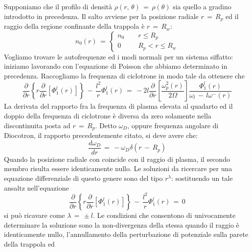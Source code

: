 Supponiamo che il profilo di densità $\rho\left(r,\,\theta\right)\,=\,\rho\left(\theta\right)$ sia quello a gradino introdotto
in precedenza. Il salto avviene per la posizione radiale $r\,=\,R_p$ ed il raggio della regione confinante della trappola 
è $r\,=\,R_w$:
\begin{equation}
    n_0\left(r\right)\,=\,
    \begin{cases}
        n_0     \qquad        r \leq R_p \\
        0       \,\,\, \qquad        R_p < r \leq R_w 
    \end{cases}
\end{equation}
Vogliamo trovare le autofrequenze ed i modi normali per un sistema siffatto: iniziamo lavorando con l'equazione di Poisson che abbiamo
determinato in precedenza. Raccogliamo la frequenza di ciclotrone in modo tale da ottenere che
\begin{equation}
    \frac{\partial}{\partial r}\left\{r\frac{\partial}{\partial r}\left[\Phi^l_1\left(r\right)\right]\right\}\,-\,\frac{l^2}{r}\Phi_1^l\left(r\right)\,=\,-2l \frac{\partial}{\partial r}\left[\frac{\omega_p^2\left(r\right)}{2\Omega}\right]\frac{\Phi_1^l\left(r\right)}{\omega_l\,-\,l\omega^-\left(r\right)}
    \label{equation: diffPhi_rhoGrad}
\end{equation}
La derivata del rapporto fra la frequenza di plasma elevata al quadarto ed il doppio della frequenza di ciclotrone è diversa da zero 
solamente nella discontinuita posta ad $r\,=\,R_p$. Detto $\omega_D$, oppure frequenza angolare di Diocotron, il rapporto precedentemente
citato, si deve avere che:
\begin{equation}
    \frac{d \omega_D}{dr}\,=\,-\omega_D\delta\left(r\,-\,R_p\right)
    \label{equation: omegaD_discontinuità}
\end{equation}
Quando la posizione radiale con coincide con il raggio di plasma, il secondo membro risulta essere identicamente nullo. Le soluzioni da
ricercare per una equazione differenziale di questo genere sono del tipo $r^{\lambda}$: sostituendo un tale ansaltz nell'equazione
\begin{equation}
    \frac{\partial}{\partial r}\left\{r\frac{\partial}{\partial r}\left[\Phi^l_1\left(r\right)\right]\right\}\,-\,\frac{l^2}{r}\Phi_1^l\left(r\right)\,=\,0
    \label{equation:autoF_noRp}
\end{equation}
si può ricavare come $\lambda\,=\,\pm l$. Le condizioni che consentono di univocamente determinare la soluzione sono la non-divergenza 
della stessa quando il raggio è identicamente nullo, l'annullamento della perturbazione di potenziale sulla parete della trappola ed 
